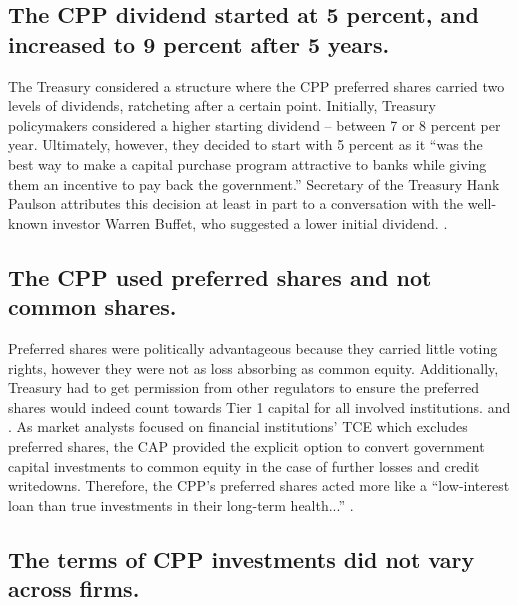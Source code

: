 \documentclass[12pt]{article}
\begin{document}
\subsection{The CPP dividend started at 5 percent, and increased to 9 percent after 5 years.}

The Treasury considered a structure where the CPP preferred shares carried two levels of dividends, ratcheting after a certain point. Initially, Treasury policymakers considered a higher starting dividend -- between 7 or 8 percent per year. Ultimately, however, they decided to start with 5 percent as it ``was the best way to make a capital purchase program attractive to banks while giving them an incentive to pay back the government.'' Secretary of the Treasury Hank Paulson attributes this decision at least in part to a conversation with the well-known investor Warren Buffet, who suggested a lower initial dividend. \citep{paulsonbook}.

\subsection{The CPP used preferred shares and not common shares.}

Preferred shares were politically advantageous because they carried little voting rights, however they were not as loss absorbing as common equity. Additionally, Treasury had to get permission from other regulators to ensure the preferred shares would indeed count towards Tier 1 capital for all involved institutions. \citep{paulsonbook} and \citep{FedTier1}.  As market analysts focused on financial institutions' TCE which excludes preferred shares, the CAP provided the explicit option to convert government capital investments to common equity in the case of further losses and credit writedowns. Therefore, the CPP's preferred shares acted more like a ``low-interest loan than true investments in their long-term health...'' \citep{Geithner}. 

\subsection{The terms of CPP investments did not vary across firms.}
\end{document}
